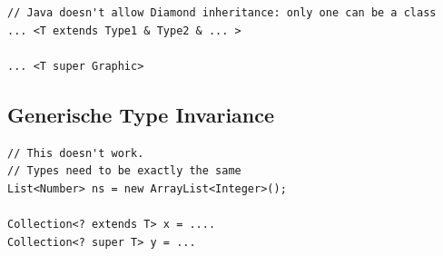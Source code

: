 \begin{multicols*}{4}
\begin{lstlisting}
// Java doesn't allow Diamond inheritance: only one can be a class
... <T extends Type1 & Type2 & ... >

... <T super Graphic>
		\end{lstlisting}
	
	\subsection{Generische Type Invariance}
		\begin{lstlisting}
// This doesn't work. 
// Types need to be exactly the same
List<Number> ns = new ArrayList<Integer>();

Collection<? extends T> x = ....
Collection<? super T> y = ...
		\end{lstlisting}


\end{multicols*}

% 


